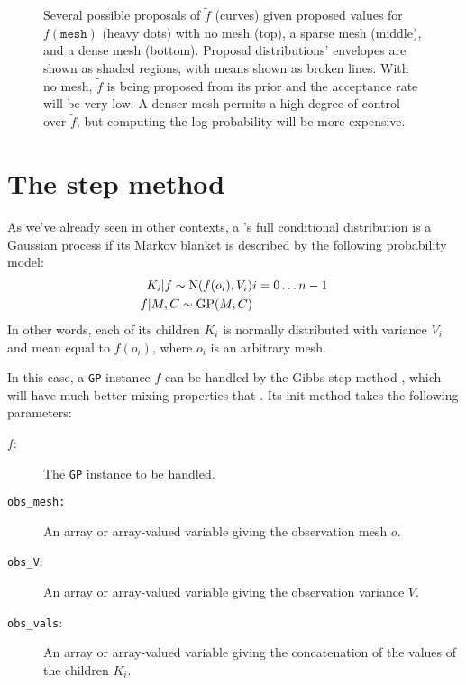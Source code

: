 \begin{figure}
    \centering
    \caption{Several possible proposals of $\tilde f$ (curves) given proposed values for $f(\texttt{mesh})$ (heavy dots) with no mesh (top), a sparse mesh (middle), and a dense mesh (bottom). Proposal distributions' envelopes are shown as shaded regions, with means shown as broken lines. With no mesh, $\tilde f$ is being proposed from its prior and the acceptance rate will be very low. A denser mesh permits a high degree of control over $\tilde f$, but computing the log-probability will be more expensive.}
    \label{fig:meshpropose}
\end{figure}


\section{The  step method}
As we've already seen in other contexts, a 's full conditional distribution is a Gaussian process if its Markov blanket is described by the following probability model:
\begin{eqnarray*}
    K_i |f \sim \textup{N}(f(o_i), V_i) & i=0\ldots n-1\\
    f|M,C\sim\textup{GP}(M,C)
\end{eqnarray*}
In other words, each of its children $K_i$ is normally distributed with variance $V_i$ and mean equal to $f(o_i)$, where $o_i$ is an arbitrary mesh.

In this case, a \texttt{GP} instance $f$ can be handled by the Gibbs step method , which will have much better mixing properties that . Its init method takes the following parameters:
\begin{description}
    \item[$f$:] The \texttt{GP} instance to be handled.
    \item[\texttt{obs_mesh:}] An array or array-valued variable giving the observation mesh $o$.
    \item[\texttt{obs_V}:] An array or array-valued variable giving the observation variance $V$.
    \item[\texttt{obs_vals}:] An array or array-valued variable giving the concatenation of the values of the children $K_i$.
\end{description}

